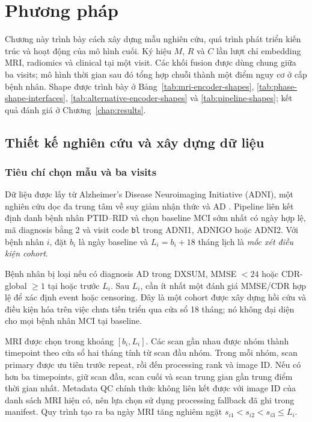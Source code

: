 \chapter{Phương pháp}
\label{chap:method}

Chương này trình bày cách xây dựng mẫu nghiên cứu, quá trình phát triển kiến trúc và hoạt động của mô hình cuối. Ký hiệu $M$, $R$ và $C$ lần lượt chỉ embedding MRI, radiomics và clinical tại một visit. Các khối fusion được dùng chung giữa ba visits; mô hình thời gian sau đó tổng hợp chuỗi thành một điểm nguy cơ ở cấp bệnh nhân. Shape được trình bày ở Bảng~\ref{tab:mri-encoder-shapes}, \ref{tab:phase-shape-interfaces}, \ref{tab:alternative-encoder-shapes} và \ref{tab:pipeline-shapes}; kết quả đánh giá ở Chương~\ref{chap:results}.

\section{Thiết kế nghiên cứu và xây dựng dữ liệu}
\label{sec:study-design}

\subsection{Tiêu chí chọn mẫu và ba visits}
Dữ liệu được lấy từ Alzheimer's Disease Neuroimaging Initiative (ADNI), một nghiên cứu dọc đa trung tâm về suy giảm nhận thức và AD \cite{weiner2015impact,jack2008adnimri}. Pipeline liên kết định danh bệnh nhân PTID--RID và chọn baseline MCI sớm nhất có ngày hợp lệ, mã diagnosis bằng 2 và visit code \texttt{bl} trong ADNI1, ADNIGO hoặc ADNI2. Với bệnh nhân $i$, đặt $b_i$ là ngày baseline và $L_i=b_i+18$ tháng lịch là \emph{mốc xét điều kiện cohort}.

Bệnh nhân bị loại nếu có diagnosis AD trong DXSUM, MMSE $<24$ hoặc CDR-global $\geq1$ tại hoặc trước $L_i$. Sau $L_i$, cần ít nhất một đánh giá MMSE/CDR hợp lệ để xác định event hoặc censoring. Đây là một cohort được xây dựng hồi cứu và điều kiện hóa trên việc chưa tiến triển qua cửa sổ 18 tháng; nó không đại diện cho mọi bệnh nhân MCI tại baseline.

MRI được chọn trong khoảng $[b_i,L_i]$. Các scan gần nhau được nhóm thành timepoint theo cửa sổ hai tháng tính từ scan đầu nhóm. Trong mỗi nhóm, scan primary được ưu tiên trước repeat, rồi đến processing rank và image ID. Nếu có hơn ba timepoints, giữ scan đầu, scan cuối và scan trung gian gần trung điểm thời gian nhất. Metadata QC chính thức không liên kết được với image ID của danh sách MRI hiện có, nên lựa chọn sử dụng processing fallback đã ghi trong manifest. Quy trình tạo ra ba ngày MRI tăng nghiêm ngặt $s_{i1}<s_{i2}<s_{i3}\leq L_i$.

